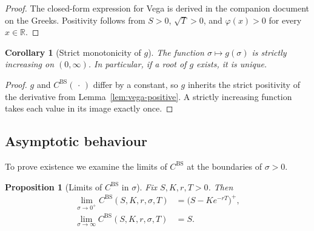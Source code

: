 \documentclass[11pt,a4paper]{article}
\theoremstyle{plain}
\newtheorem{proposition}[theorem]{Proposition}
\newtheorem{corollary}[theorem]{Corollary}
\theoremstyle{definition}
\theoremstyle{remark}
\newcommand{\R}{\mathbb{R}}
\newcommand{\BS}{\mathrm{BS}}
\begin{document}
\begin{proof}
The closed-form expression for Vega is derived in the companion
document on the Greeks. Positivity follows from \(S > 0\),
\(\sqrt{T} > 0\), and \(\varphi(x) > 0\) for every \(x \in \R\).
\end{proof}

\begin{corollary}[Strict monotonicity of \(g\)]
\label{cor:g-monotone}
The function \(\sigma \mapsto g(\sigma)\) is strictly increasing on
\((0, \infty)\). In particular, if a root of \(g\) exists, it is unique.
\end{corollary}

\begin{proof}
\(g\) and \(C^{\BS}(\,\cdot\,)\) differ by a constant, so \(g\) inherits
the strict positivity of the derivative from
Lemma~\ref{lem:vega-positive}. A strictly increasing function takes
each value in its image exactly once.
\end{proof}

\subsection{Asymptotic behaviour}

To prove existence we examine the limits of \(C^{\BS}\) at the
boundaries of \(\sigma > 0\).

\begin{proposition}[Limits of \(C^{\BS}\) in \(\sigma\)]
\label{prop:limits}
Fix \(S, K, r, T > 0\). Then
\begin{align}
    \lim_{\sigma \to 0^+} C^{\BS}(S, K, r, \sigma, T)
    &= \bigl(S - K e^{-rT}\bigr)^+,
    \label{eq:limit-zero}\\[2pt]
    \lim_{\sigma \to \infty} C^{\BS}(S, K, r, \sigma, T)
    &= S.
    \label{eq:limit-infty}
\end{align}
\end{proposition}
\end{document}
